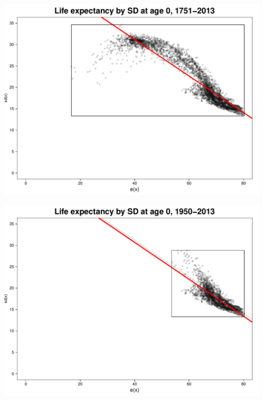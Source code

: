 \documentclass[xcolor={dvipsnames}]{beamer}
\begin{document}
\begin{frame}
		
			\begin{center}
		\includegraphics[scale=.53]{Figures/Fig1}
				\end{center}
			
\end{frame}


\begin{frame}
		
			\begin{center}
		\includegraphics[scale=.53]{Figures/Fig2}
				\end{center}
			
\end{frame}
\end{document}
